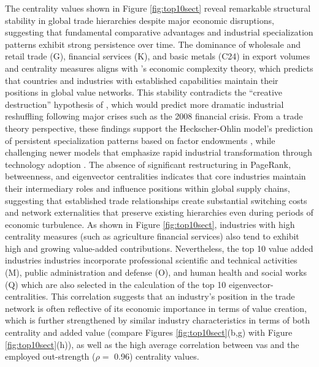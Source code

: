 \documentclass[preprint, 3p,
authoryear]{elsarticle} %
\begin{document}
The centrality values shown in Figure \ref{fig:top10sect} reveal
remarkable structural stability in global trade hierarchies despite
major economic disruptions, suggesting that fundamental comparative
advantages and industrial specialization patterns exhibit strong
persistence over time. The dominance of wholesale and retail trade (G),
financial services (K), and basic metals (C24) in export volumes and
centrality measures aligns with \citet{hausmann2011network}'s economic
complexity theory, which predicts that countries and industries with
established capabilities maintain their positions in global value
networks. This stability contradicts the ``creative destruction''
hypothesis of \citet{schumpeter2013capitalism}, which would predict more
dramatic industrial reshuffling following major crises such as the 2008
financial crisis. From a trade theory perspective, these findings
support the Heckscher-Ohlin model's prediction of persistent
specialization patterns based on factor endowments
\citep{leamer1995heckscher}, while challenging newer models that
emphasize rapid industrial transformation through technology adoption
\citep{grossman1993innovation, helpman2025future}. The absence of
significant restructuring in PageRank, betweenness, and eigenvector
centralities indicates that core industries maintain their intermediary
roles and influence positions within global supply chains, suggesting
that established trade relationships create substantial switching costs
and network externalities that preserve existing hierarchies even during
periods of economic turbulence. As shown in Figure \ref{fig:top10sect},
industries with high centrality measures (such as agriculture financial
services) also tend to exhibit high and growing value-added
contributions. Nevertheless, the top 10 value added industries
industries incorporate professional scientific and technical activities
(M), public administration and defense (O), and human health and social
works (Q) which are also selected in the calculation of the top 10
eigenvector-centralities. This correlation suggests that an industry's
position in the trade network is often reflective of its economic
importance in terms of value creation, which is further strengthened by
similar industry characteristics in terms of both centrality and added
value (compare Figures \ref{fig:top10sect}(b,g) with Figure
\ref{fig:top10sect}(h)), as well as the high average correlation between
\glspl{va} and the employed out-strength (\(\rho =\) 0.96) centrality
values.
\end{document}
